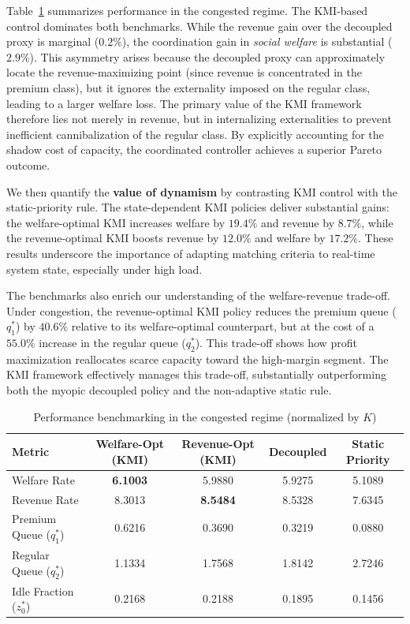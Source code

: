 Table~\ref{tab:benchmarks-congested} summarizes performance in the congested regime.
The KMI-based control dominates both benchmarks.
While the revenue gain over the decoupled proxy is marginal ($0.2\%$), the coordination gain in \textit{social welfare} is substantial ($2.9\%$).
This asymmetry arises because the decoupled proxy can approximately locate the revenue-maximizing point (since revenue is concentrated in the premium class), but it ignores the externality imposed on the regular class, leading to a larger welfare loss.
The primary value of the KMI framework therefore lies not merely in revenue, but in internalizing externalities to prevent inefficient cannibalization of the regular class.
By explicitly accounting for the shadow cost of capacity, the coordinated controller achieves a superior Pareto outcome.

We then quantify the \textbf{value of dynamism} by contrasting KMI control with the static-priority rule.
The state-dependent KMI policies deliver substantial gains: the welfare-optimal KMI increases welfare by $19.4\%$ and revenue by $8.7\%$, while the revenue-optimal KMI boosts revenue by $12.0\%$ and welfare by $17.2\%$.
These results underscore the importance of adapting matching criteria to real-time system state, especially under high load.

The benchmarks also enrich our understanding of the welfare-revenue trade-off.
Under congestion, the revenue-optimal KMI policy reduces the premium queue ($q_1^*$) by $40.6\%$ relative to its welfare-optimal counterpart, but at the cost of a $55.0\%$ increase in the regular queue ($q_2^*$).
This trade-off shows how profit maximization reallocates scarce capacity toward the high-margin segment.
The KMI framework effectively manages this trade-off, substantially outperforming both the myopic decoupled policy and the non-adaptive static rule.

\begin{table}[htbp]
\centering
\caption{Performance benchmarking in the congested regime (normalized by $K$)}
\label{tab:benchmarks-congested}
\small
\begin{tabular}{lcccc}
\toprule
Metric & Welfare-Opt (KMI) & Revenue-Opt (KMI) & Decoupled & Static Priority \\
\midrule
Welfare Rate & \textbf{6.1003} & 5.9880 & 5.9275 & 5.1089 \\
Revenue Rate & 8.3013 & \textbf{8.5484} & 8.5328 & 7.6345 \\
Premium Queue ($q_1^*$) & 0.6216 & 0.3690 & 0.3219 & 0.0880 \\
Regular Queue ($q_2^*$) & 1.1334 & 1.7568 & 1.8142 & 2.7246 \\
Idle Fraction ($z_0^*$) & 0.2168 & 0.2188 & 0.1895 & 0.1456 \\
\bottomrule
\end{tabular}
\end{table}

